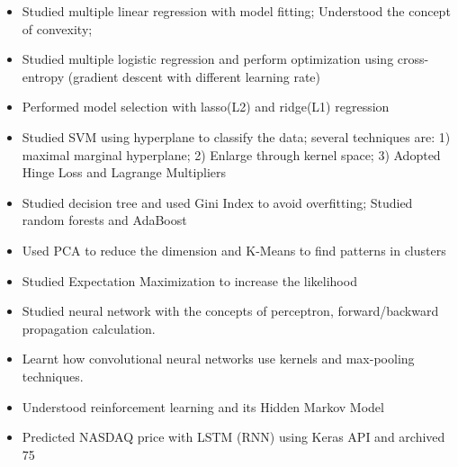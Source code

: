\begin{enumerate}
{  \item{  
    \begin{itemize}
       \item Studied multiple linear regression with model fitting; Understood the concept of convexity;   \item Studied multiple logistic regression and perform optimization using cross-entropy (gradient descent with different learning rate) 
       \item Performed model selection with lasso(L2) and ridge(L1) regression  
       \item Studied SVM using hyperplane to classify the data; several techniques are: 1) maximal marginal hyperplane; 2) Enlarge through kernel space; 3) Adopted Hinge Loss and Lagrange Multipliers 
       \item Studied decision tree and used Gini Index to avoid overfitting; Studied random forests and AdaBoost  
       \item Used PCA to reduce the dimension and K-Means to find patterns in clusters
       \item Studied Expectation Maximization to increase the likelihood   
       \item Studied neural network with the concepts of perceptron, forward/backward propagation calculation. \item Learnt how convolutional neural networks use kernels and max-pooling techniques.  
       \item Understood reinforcement learning and its Hidden Markov Model 
       \item Predicted NASDAQ price with LSTM (RNN) using Keras API and archived 75%
    \end{itemize}
    
}}
\end{enumerate}
